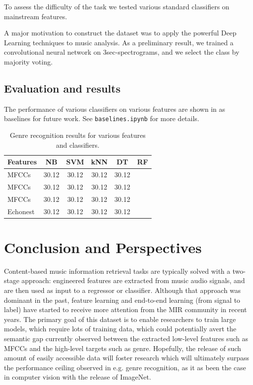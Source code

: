 \documentclass{article}
\begin{document}
To assess the difficulty of the task we tested various standard classifiers on mainstream features.

A major motivation to construct the dataset was to apply the powerful Deep Learning techniques to music analysis. As a preliminary result, we trained a convolutional neural network on 3sec-spectrograms, and we select the class by majority voting.

\subsection{Evaluation and results}

The performance of various classifiers on various features are shown in  as baselines for future work.
See \texttt{baselines.ipynb} for more details.


\begin{table}
	\centering
	\begin{tabular}{lccccc}
		\toprule
		Features & NB & SVM & kNN & DT & RF \\
		\midrule
		MFCCs  & 30.12 & 30.12 & 30.12 & 30.12 \\
		MFCCs  & 30.12 & 30.12 & 30.12 & 30.12 \\
		MFCCs  & 30.12 & 30.12 & 30.12 & 30.12 \\
		Echonest  & 30.12 & 30.12 & 30.12 & 30.12 \\
		\bottomrule
	\end{tabular}
	\caption{Genre recognition results for various features and classifiers.}
	\label{tab:mgr}
\end{table}


\section{Conclusion and Perspectives}


Content-based music information retrieval tasks are typically solved with a two-stage approach: engineered features are extracted from music audio signals, and are then used as input to a regressor or classifier.
Although that approach was dominant in the past, feature learning and end-to-end learning (from signal to label) have started to receive more attention from the MIR community in recent years. 
The primary goal of this dataset is to enable researchers to train large models, which require lots of training data, which could potentially avert the semantic gap currently observed between the extracted low-level features such as MFCCs and the high-level targets such as genre.
Hopefully, the release of such amount of easily accessible data will foster research which will ultimately surpass the performance ceiling observed in e.g. genre recognition, as it as been the case in computer vision with the release of ImageNet.
\end{document}
